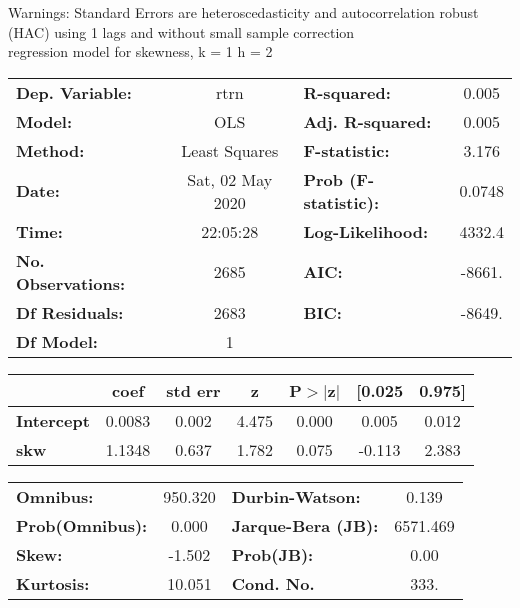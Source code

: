Warnings: \newline
 [1] Standard Errors are heteroscedasticity and autocorrelation robust (HAC) using 1 lags and without small sample correction\\ 

regression model for skewness, k = 1 h = 2\begin{center}
\begin{tabular}{lclc}
\toprule
\textbf{Dep. Variable:}    &       rtrn       & \textbf{  R-squared:         } &     0.005   \\
\textbf{Model:}            &       OLS        & \textbf{  Adj. R-squared:    } &     0.005   \\
\textbf{Method:}           &  Least Squares   & \textbf{  F-statistic:       } &     3.176   \\
\textbf{Date:}             & Sat, 02 May 2020 & \textbf{  Prob (F-statistic):} &   0.0748    \\
\textbf{Time:}             &     22:05:28     & \textbf{  Log-Likelihood:    } &    4332.4   \\
\textbf{No. Observations:} &        2685      & \textbf{  AIC:               } &    -8661.   \\
\textbf{Df Residuals:}     &        2683      & \textbf{  BIC:               } &    -8649.   \\
\textbf{Df Model:}         &           1      & \textbf{                     } &             \\
\bottomrule
\end{tabular}
\begin{tabular}{lcccccc}
                   & \textbf{coef} & \textbf{std err} & \textbf{z} & \textbf{P$> |$z$|$} & \textbf{[0.025} & \textbf{0.975]}  \\
\midrule
\textbf{Intercept} &       0.0083  &        0.002     &     4.475  &         0.000        &        0.005    &        0.012     \\
\textbf{skw}       &       1.1348  &        0.637     &     1.782  &         0.075        &       -0.113    &        2.383     \\
\bottomrule
\end{tabular}
\begin{tabular}{lclc}
\textbf{Omnibus:}       & 950.320 & \textbf{  Durbin-Watson:     } &    0.139  \\
\textbf{Prob(Omnibus):} &   0.000 & \textbf{  Jarque-Bera (JB):  } & 6571.469  \\
\textbf{Skew:}          &  -1.502 & \textbf{  Prob(JB):          } &     0.00  \\
\textbf{Kurtosis:}      &  10.051 & \textbf{  Cond. No.          } &     333.  \\
\bottomrule
\end{tabular}
\end{center}

